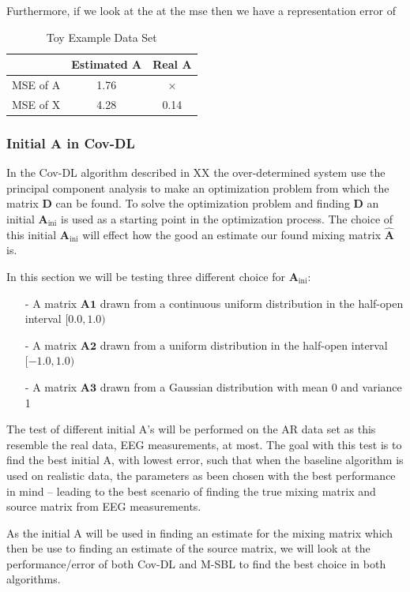 \noindent
Furthermore, if we look at the at the mse then we have a representation error of

\begin{table}[H]
\centering
\begin{tabular}{|c|c|c|}
\hline
         & Estimated A & Real A \\ \hline
MSE of A & 1.76 & $\times$ \\ 
\hline 
MSE of X & 4.28 & 0.14 \\ 
\hline
\end{tabular} 
\caption{Toy Example Data Set}
\end{table}

\subsubsection{Initial A in Cov-DL}
In the Cov-DL algorithm described in XX the over-determined system use the principal component analysis to make an optimization problem from which the matrix $\mathbf{D}$ can be found. To solve the optimization problem and finding $\mathbf{D}$ an initial $\mathbf{A}_{\text{ini}}$ is used as a starting point in the optimization process. The choice of this initial $\mathbf{A}_{\text{ini}}$ will effect how the good an estimate our found mixing matrix $\hat{\mathbf{A}}$ is.

In this section we will be testing three different choice for $\mathbf{A}_{\text{ini}}$:
\begin{itemize}
\item[-] A matrix $\mathbf{A1}$ drawn from a continuous uniform distribution in the half-open interval $[0.0, 1.0)$
\item[-] A matrix $\mathbf{A2}$ drawn from a uniform distribution in the half-open interval $[-1.0, 1.0)$
\item[-] A matrix $\mathbf{A3}$ drawn from a Gaussian distribution with mean 0 and variance 1
\end{itemize}
The test of different initial A's will be performed on the AR data set as this resemble the real data, EEG measurements, at most. The goal with this test is to find the best initial A, with lowest error, such that when the baseline algorithm is used on realistic data, the parameters as been chosen with the best performance in mind -- leading to the best scenario of finding the true mixing matrix and source matrix from EEG measurements.

As the initial A will be used in finding an estimate for the mixing matrix which then be use to finding an estimate of the source matrix, we will look at the performance/error of both Cov-DL and M-SBL to find the best choice in both algorithms.

